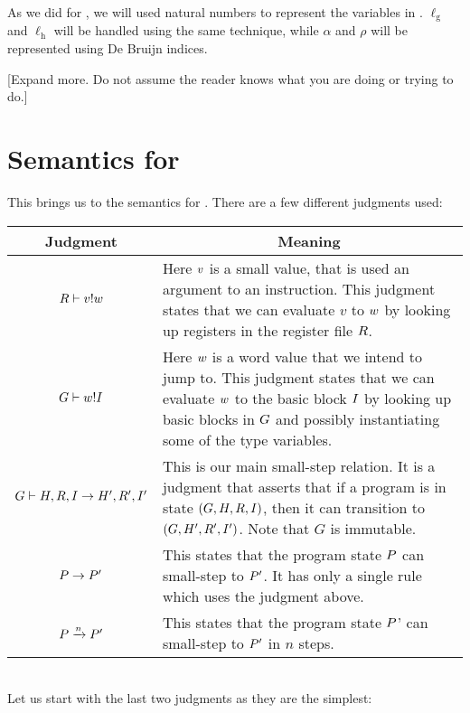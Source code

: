 As we did for \ATALe, we will used natural numbers to represent the variables in
\ATAL. $\ell_{\mathrm{g}}$ and $\ell_{\mathrm{h}}$ will be handled using the
same technique, while $\alpha$ and $\rho$ will be represented using De Bruijn
indices.

[Expand more. Do not assume the reader knows what you are doing or trying to do.]

\section{Semantics for \ATAL}

This brings us to the semantics for \ATAL. There are a few different judgments
used:

\begin{tabular}{|c|p{7.5 cm}|}
  \hline
  Judgment & \multicolumn{1}{|c|}{Meaning} \\\hline
  $\evalregs{\high R}{\high v}{\high w}$ & Here $\high v$ is a small value, that is used an argument to an instruction. This judgment states that we can evaluate $v$ to $\high w$ by looking up registers in the register file $\high R$. \\\hline
  $\evalcode{\high G}{\high w}{I}$ & Here $\high w$ is a word value that we intend to jump to. This judgment states that we can evaluate $\high w$ to the basic block $\high I$ by looking up basic blocks in $\high G$ and possibly instantiating some of the type variables. \\\hline
  $\execis{\high G}{\high H, \high R, \high I}{\high H', \high R', \high I'}$ & This is our main small-step relation. It is a judgment that asserts that if a program is in state $(\high G, \high H, \high R, \high I)$, then it can transition to $(\high G, \high H', \high R', \high I')$. Note that $G$ is immutable. \\\hline
  $\steps{\high P}{\high P'}$ & This states that the program state $\high P$ can small-step to $\high P'$. It has only a single rule which uses the judgment above. \\\hline
  $\stepsn{\high P}{n}{\high P'}$ & This states that the program state $\high P$' can small-step to $\high P'$ in $n$ steps. \\\hline
\end{tabular} \\

Let us start with the last two judgments as they are the simplest: \\

\begin{mathpar}
\end{mathpar}


